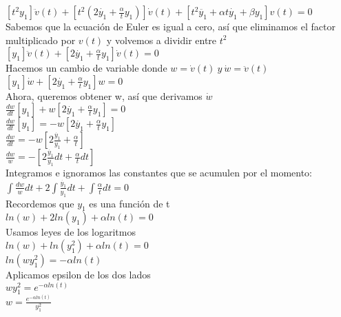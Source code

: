 \documentclass{article}
\begin{document}
\begin{enumerate}
{            $[t^2y_1]\ddot{v}(t) + [t^2(2\dot{y_1} + \frac{\alpha}{t}y_1)]\dot{v}(t) + [t^2\ddot{y_1} + \alpha t \dot{y_1} + \beta y_1]v(t) = 0$\\
            
            Sabemos que la ecuación de Euler es igual a cero, así que eliminamos el factor multiplicado por $v(t)$ y volvemos a dividir entre $t^2$\\
            $[y_1]\ddot{v}(t) + [2\dot{y_1} + \frac{\alpha}{t}y_1]\dot{v}(t) = 0$\\
            
            Hacemos un cambio de variable donde $w = \dot{v}(t) \ y \  \dot{w} = \ddot{v}(t)$\\
             $[y_1]\dot{w} + [2\dot{y_1} + \frac{\alpha}{t}y_1]w = 0$\\
             
             Ahora, queremos obtener w, así que derivamos $\dot{w}$\\
             $\frac{dw}{dt}[y_1] + w[2\dot{y_1} + \frac{\alpha}{t}y_1] = 0$\\
             $\frac{dw}{dt}[y_1] = - w[2\dot{y_1} + \frac{\alpha}{t}y_1]$\\
             $\frac{dw}{dt} = - w[2\frac{\dot{y_1}}{y_1} + \frac{\alpha}{t}]$\\
             $\frac{dw}{w} = - [2\frac{\dot{y_1}}{y_1}dt + \frac{\alpha}{t}dt]$\\
             
             Integramos e ignoramos las constantes que se acumulen por el momento:\\
             $\int \frac{dw}{w} dt + 2 \int \frac{\dot{y_1}}{y_1} dt + \int \frac{\alpha}{t} dt = 0 $\\
             
             Recordemos que $y_1$ es una función de t\\
             $ln(w) + 2ln(y_1) + \alpha ln(t) = 0$\\
             
             Usamos leyes de los logaritmos\\
             $ln(w) + ln(y_1^2) + \alpha ln(t) = 0$\\
             $ln(w y_1^2) = -\alpha ln(t) $\\
             
             Aplicamos epsilon de los dos lados\\
             $wy_1^2 = e^{-\alpha ln(t)}$\\
             $w = \frac{e^{-\alpha ln(t)}}{y_1^2}$\\
             
}
\end{enumerate}
\end{document}
